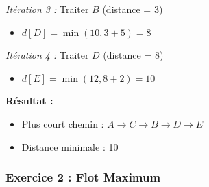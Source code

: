 \documentclass[12pt,a4paper]{article}
\begin{document}
\begin{exemple}
\textit{Itération 3 :} Traiter $B$ (distance = 3)
\begin{itemize}
    \item $d[D] = \min(10, 3 + 5) = 8$
\end{itemize}

\textit{Itération 4 :} Traiter $D$ (distance = 8)
\begin{itemize}
    \item $d[E] = \min(12, 8 + 2) = 10$
\end{itemize}

\textbf{Résultat :}
\begin{itemize}
    \item Plus court chemin : $A \to C \to B \to D \to E$
    \item Distance minimale : 10
\end{itemize}
\end{exemple}

\newpage
\subsubsection*{Exercice 2 : Flot Maximum}
\end{document}
